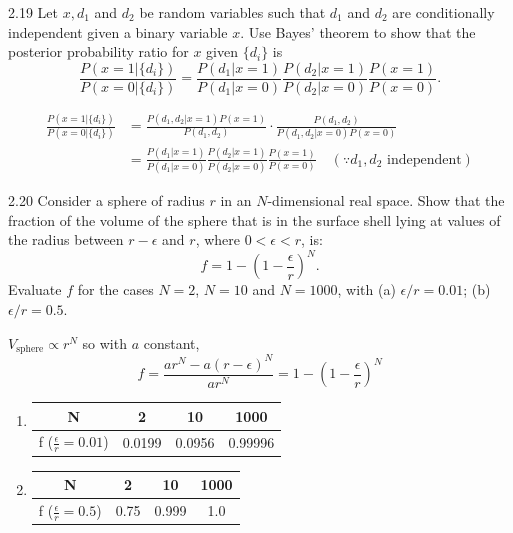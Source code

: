 \documentclass[12pt, a4paper]{article}
\begin{document}
\begin{prob}{2.19}
    Let $x, d_1$ and $d_2$ be random variables such that $d_1$ and $d_2$ are conditionally independent given a binary variable $x$. Use Bayes' theorem to show that the posterior probability ratio for $x$ given $\{d_i\}$ is
\begin{equation}
\frac{P(x=1 | \{d_i\})}{P(x=0 | \{d_i\})} = \frac{P(d_1 | x=1)}{P(d_1 | x=0)} \frac{P(d_2 | x=1)}{P(d_2 | x=0)} \frac{P(x=1)}{P(x=0)}. \tag{2.52}
\end{equation}
\end{prob}
\begin{sol}
    \begin{align*}
        \frac{P(x=1 | \{d_i\})}{P(x=0 | \{d_i\})} &=\frac{P(d_1, d_2 | x=1) P(x=1)}{P(d_1, d_2)} \cdot \frac{P(d_1, d_2)}{P(d_1, d_2 | x=0) P(x=0)} \\
        &= \frac{P(d_1 | x=1)}{P(d_1 | x=0)} \frac{P(d_2 | x=1)}{P(d_2 | x=0)} \frac{P(x=1)}{P(x=0)} \quad (\because d_1, d_2 \text{ independent})
    \end{align*}
\end{sol}
\bigskip

\begin{prob}{2.20}
    Consider a sphere of radius $r$ in an $N$-dimensional real space. Show that the fraction of the volume of the sphere that is in the surface shell lying at values of the radius between $r - \epsilon$ and $r$, where $0 < \epsilon < r$, is:
\begin{equation}
f = 1 - \left( 1 - \frac{\epsilon}{r} \right)^N. \tag{2.53}
\end{equation}
Evaluate $f$ for the cases $N = 2$, $N = 10$ and $N = 1000$, with (a) $\epsilon/r = 0.01$; (b) $\epsilon/r = 0.5$.

\end{prob}
\begin{sol}
    $V_{\text{sphere}} \propto r^N$ so with $a$ constant,\\
\begin{equation*}
    f = \frac{ar^N - a(r-\epsilon)^N}{ar^N} = 1 - (1 - \frac{\epsilon}{r})^N
\end{equation*}
\begin{enumerate}
    \item[(a)] 
\begin{tabular}{c|ccc}
    N & 2 & 10 & 1000 \\
    \hline
    f ($\frac{\epsilon}{r} = 0.01$) & 0.0199 & 0.0956 & 0.99996 \\
\end{tabular}
    \item[(b)] 
\begin{tabular}{c|ccc}
    N & 2 & 10 & 1000 \\
    \hline
    f ($\frac{\epsilon}{r} = 0.5$) & 0.75 & 0.999 & 1.0 \\
\end{tabular}
\end{enumerate}
\end{sol}
\bigskip
\end{document}
